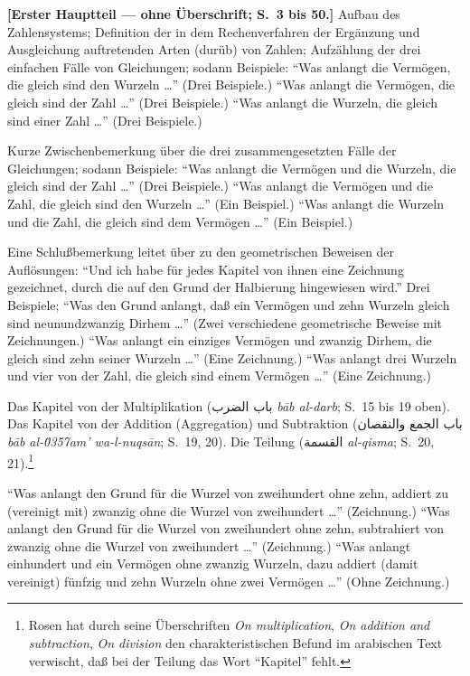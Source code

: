 \documentclass[11pt,a4paper]{article}
\newcommand{\RL}[1]{\beginR#1\endR}
\newcommand{\ar}[1]{{\arabicfont\RL{#1}}}
\newcommand{\enquote}[1]{``#1''}
\begin{document}
\textbf{[Erster Hauptteil --- ohne \"Uberschrift; S.\ 3 bis 50.]} Aufbau des Zahlensystems; Definition der in dem Rechenverfahren der Erg\"anzung und Ausgleichung auftretenden Arten (dur\"ub) von Zahlen; Aufz\"ahlung der drei einfachen F\"alle von Gleichungen; sodann Beispiele: \enquote{Was anlangt die Verm\"ogen, die gleich sind den Wurzeln \ldots{}} (Drei Beispiele.) \enquote{Was anlangt die Verm\"ogen, die gleich sind der Zahl \ldots{}} (Drei Beispiele.) \enquote{Was anlangt die Wurzeln, die gleich sind einer Zahl \ldots{}} (Drei Beispiele.)

Kurze Zwischenbemerkung \"uber die drei zusammengesetzten F\"alle der Gleichungen; sodann Beispiele: \enquote{Was anlangt die Verm\"ogen und die Wurzeln, die gleich sind der Zahl \ldots{}} (Drei Beispiele.) \enquote{Was anlangt die Verm\"ogen und die Zahl, die gleich sind den Wurzeln \ldots{}} (Ein Beispiel.) \enquote{Was anlangt die Wurzeln und die Zahl, die gleich sind dem Verm\"ogen \ldots{}} (Ein Beispiel.)

Eine Schlu\ss{}bemerkung leitet \"uber zu den geometrischen Beweisen der Aufl\"osungen: \enquote{Und ich habe f\"ur jedes Kapitel von ihnen eine Zeichnung gezeichnet, durch die auf den Grund der Halbierung hingewiesen wird.} Drei Beispiele; \enquote{Was den Grund anlangt, da\ss{} ein Verm\"ogen und zehn Wurzeln gleich sind neunundzwanzig Dirhem \ldots{}} (Zwei verschiedene geometrische Beweise mit Zeichnungen.) \enquote{Was anlangt ein einziges Verm\"ogen und zwanzig Dirhem, die gleich sind zehn seiner Wurzeln \ldots{}} (Eine Zeichnung.) \enquote{Was anlangt drei Wurzeln und vier von der Zahl, die gleich sind einem Verm\"ogen \ldots{}} (Eine Zeichnung.)

Das Kapitel von der Multiplikation (\ar{باب الضرب} \textit{b\=ab al-darb}; S.\ 15 bis 19 oben). Das Kapitel von der Addition (Aggregation) und Subtraktion (\ar{باب الجمع والنقصان} \textit{b\=ab al-\u0357{}am' wa-l-nuqs\=an}; S.\ 19, 20). Die Teilung (\ar{القسمة} \textit{al-qisma}; S.\ 20, 21).\footnote{Rosen hat durch seine \"Uberschriften \textit{On multiplication}, \textit{On addition and subtraction}, \textit{On division} den charakteristischen Befund im arabischen Text verwischt, da\ss{} bei der Teilung das Wort \enquote{Kapitel} fehlt.}

\enquote{Was anlangt den Grund f\"ur die Wurzel von zweihundert ohne zehn, addiert zu (vereinigt mit) zwanzig ohne die Wurzel von zweihundert \ldots{}} (Zeichnung.) \enquote{Was anlangt den Grund f\"ur die Wurzel von zweihundert ohne zehn, subtrahiert von zwanzig ohne die Wurzel von zweihundert \ldots{}} (Zeichnung.) \enquote{Was anlangt einhundert und ein Verm\"ogen ohne zwanzig Wurzeln, dazu addiert (damit vereinigt) f\"unfzig und zehn Wurzeln ohne zwei Verm\"ogen \ldots{}} (Ohne Zeichnung.)
\end{document}
